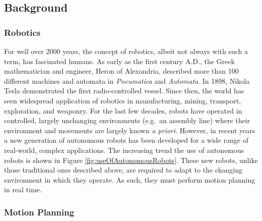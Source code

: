 
\subsection{Background}

    \subsubsection*{Robotics}
        For well over 2000 years, the concept of robotics, albeit not always with such a term, has fascinated humans. As early as the first century A.D., the Greek mathematician and engineer, Heron of Alexandria, described more than 100 different machines and automata in \textit{Pneumatica} and \textit{Automata}\cite{Alexandrinus}. In 1898, Nikola Tesla demonstrated the first radio-controlled vessel. Since then, the world has seen widespread application of robotics in manufacturing, mining, transport, exploration, and weaponry. For the last few decades, robots have operated in controlled, largely unchanging environments (e.g.\ an assembly line) where their environment and movements are largely known \textit{a priori}.
        \newline
        However, in recent years a new generation of autonomous robots has been developed for a wide range of real-world, complex applications. The increasing trend the use of autonomous robots is shown in Figure \ref{fig:useOfAutonomousRobots}. These new robots, unlike those traditional ones described above, are required to adapt to the changing environment in which they operate. As such, they must perform motion planning in real time.

        

    \subsubsection*{Motion Planning}
        
